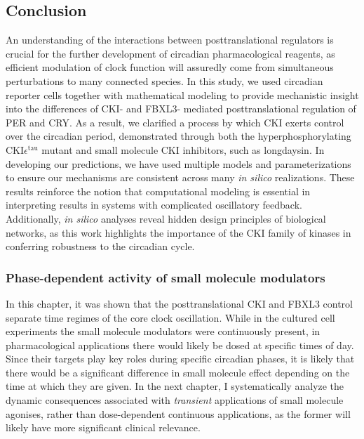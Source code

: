 \subsection{Conclusion}
An understanding of the interactions between posttranslational regulators is crucial for the further development of circadian pharmacological reagents, as efficient modulation of clock function will assuredly come from simultaneous perturbations to many connected species. 
In this study, we used circadian reporter cells together with mathematical modeling to provide mechanistic insight into the differences of CKI- and FBXL3- mediated posttranslational regulation of PER and CRY. 
As a result, we clarified a process by which CKI exerts control over the circadian period, demonstrated through both the hyperphosphorylating CKI$\epsilon^\mathrm{tau}$ mutant and small molecule CKI inhibitors, such as longdaysin. 
In developing our predictions, we have used multiple models and parameterizations to ensure our mechanisms are consistent across many {\it in silico} realizations. 
These results reinforce the notion that computational modeling is essential in interpreting results in systems with complicated oscillatory feedback. 
Additionally, {\it in silico} analyses reveal hidden design principles of biological networks, as this work highlights the importance of the CKI family of kinases in conferring robustness to the circadian cycle. 
 
\subsubsection{Phase-dependent activity of small molecule modulators}
In this chapter, it was shown that the posttranslational CKI and FBXL3 control separate time regimes of the core clock oscillation. 
While in the cultured cell experiments the small molecule modulators were continuously present, in pharmacological applications there would likely be dosed at specific times of day. 
Since their targets play key roles during specific circadian phases, it is likely that there would be a significant difference in small molecule effect depending on the time at which they are given. 
In the next chapter, I systematically analyze the dynamic consequences associated with {\itshape transient} applications of small molecule agonises, rather than dose-dependent continuous applications, as the former will likely have more significant clinical relevance. 
